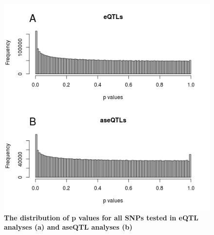 \begin{figure}[h!]
      \centering
       \includegraphics[width=\linewidth]{Ch3FigS2}
    \caption{\textbf{The distribution of p values for all SNPs tested in eQTL analyses (a) and aseQTL analyses (b)}}
    \label{fig:3figS2}
\end{figure}

